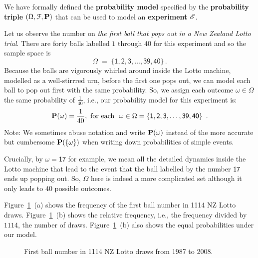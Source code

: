 We have formally defined the {\bf probability model} specified by the {\bf probability triple} $(\Omega, \mathcal{F},\mathbf{P})$ that can be used to model an {\bf experiment} $\mathscr{E}$.

\begin{example}\label{Eg:NZLottoModel}
Let us observe the number on {\em the first ball that pops out in a New Zealand Lotto trial}.  
There are forty balls labelled $1$ through $40$ for this experiment and so the sample space is \[\Omega\;=\;\{\mathsf{1,2,3,\dots,39,40}\}\,.\]  
Because the balls are vigorously whirled around inside the Lotto machine, modelled as a well-stirrred urn, before the first one pops out, 
we can model each ball to pop out first with the same probability. 
So, we assign each outcome $\omega \in \Omega$ the same probability of $\frac{1}{40}$, i.e., our probability model for this experiment is:
\[
\mathbf{P}(\omega) = \frac{1}{40}, \ \text{for each \ } \omega \in \Omega = \{\mathsf{1,2,3,\ldots,39,40}\} \enspace .
\]
Note: We sometimes abuse notation and write $\mathbf{P}(\omega)$ instead of the
more accurate but cumbersome $\mathbf{P}(\{\omega\})$ when writing down
probabilities of simple events. 

Crucially, by $\omega=\mathsf{17}$ for example, we mean all the detailed dynamics inside the Lotto machine that lead to the event that the ball labelled by the number $\mathsf{17}$ ends up popping out. 
So, $\Omega$ here is indeed a more complicated set although it only leads to $40$ possible outcomes.

Figure~\ref{F:LottoDraws}~(a) shows the frequency of the first ball number in 1114 NZ Lotto draws.  
Figure~\ref{F:LottoDraws}~(b) shows the relative frequency, i.e., the frequency divided by $1114$, the number of draws.  
Figure~\ref{F:LottoDraws}~(b) also shows the equal probabilities under our model.

\begin{figure}[htbp]
\centering
{}
\quad
{}
\caption{First ball number in 1114 NZ Lotto draws from 1987 to 2008.\label{F:LottoDraws}}
\end{figure}
\end{example}


